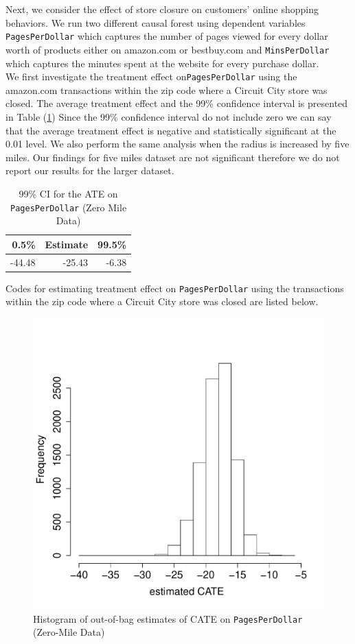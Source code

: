 \documentclass{article}
\begin{document}
Next, we consider the effect of store closure on customers' online shopping behaviors. We run two different causal forest using dependent variables \texttt{PagesPerDollar} which captures the number of pages viewed for every dollar worth of products either on amazon.com or bestbuy.com and \texttt{MinsPerDollar} which captures the minutes spent at the website for every purchase dollar. \\
We first investigate the treatment effect on\texttt{PagesPerDollar} using the amazon.com transactions within the zip code where a Circuit City store was closed. The average treatment effect  and the 99\% confidence interval is presented in Table (\ref{tab:ama_cf3_ate}) Since the 99\% confidence interval do not include zero we can say that the average treatment effect is negative and statistically significant at the 0.01 level. We also perform the same analysis when the radius is increased by five miles. Our findings for five miles dataset are not significant therefore we do not report our results for the larger dataset.
\begin{table}[h]
	\caption{99\% CI for the ATE on \texttt{PagesPerDollar} (Zero Mile Data)} 
	\label{tab:ama_cf3_ate}
	\vspace{1em}
	\centering
	\begin{tabular}{rrr}
		\hline
		0.5\%  & Estimate & 99.5\% \\ 
		\hline
		-44.48 & -25.43 & -6.38 \\ 
		\hline
	\end{tabular}
\end{table}

Codes for estimating treatment effect on \texttt{PagesPerDollar} using the transactions within the zip code where a Circuit City store was closed are listed below.


\begin{figure}[h]
	\centering
	\includegraphics[width=0.5\linewidth]{pic/tauhat3_ama_hist.pdf}\caption{Histogram of out-of-bag estimates of CATE  on \texttt{PagesPerDollar} (Zero-Mile Data)}\label{fig:tauhat3_ama_hist}
\end{figure}
\end{document}
